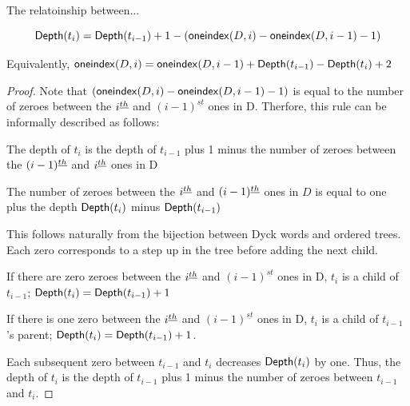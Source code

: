 \begin{remark} \label{re:depthformula}
    The relatoinship between...

    \begin{equation}
    	\mathsf{Depth}{(t_i)}=\mathsf{Depth}{(t_{i-1})}+1-(\mathsf{oneindex}({D}, i)-\mathsf{oneindex}({D}, i-1)-1) 
    \end{equation}
    

    Equivalently, $\mathsf{oneindex}({D}, i) = \mathsf{oneindex}({D}, i-1) + \mathsf{Depth}{(t_{i-1})} - \mathsf{Depth}{(t_i)} + 2$
\end{remark}
\begin{proof}

    Note that $(\mathsf{oneindex}({D}, i)-\mathsf{oneindex}({D}, i-1)-1)$ is equal to the number of zeroes between the $i^{\underline{th}}$ and $(i-1)^{\underline{st}}$ ones in D.  Therfore, this rule can be informally described as follows:

    The depth of $t_i$ is the depth of $t_{i-1}$ plus 1 minus the number of zeroes between the $(i-1)^{\underline{th}}$ and $i^{\underline{th}}$ ones in D

    The number of zeroes between the $i^{\underline{th}}$ and $(i-1)^{\underline{th}}$ ones in $D$ is equal to one plus the depth  $\mathsf{Depth}{(t_i)}$ minus $\mathsf{Depth}{(t_{i-1})}$

    This follows naturally from the bijection between Dyck words and ordered trees.  Each zero corresponds to a step up in the tree before adding the next child.  

    If there are zero zeroes between the $i^{\underline{th}}$  and $(i-1)^{\underline{st}}$ ones in D, $t_i$ is a child of $t_{i-1}$; $\mathsf{Depth}{(t_i)}=\mathsf{Depth}{(t_{i-1})}+1$

    If there is one zero between the $i^{\underline{th}}$  and $(i-1)^{\underline{st}}$ ones in D, $t_i$ is a child of $t_{i-1}$'s parent; $\mathsf{Depth}{(t_i)}=\mathsf{Depth}{(t_{i-1})}+1$.  

    Each subsequent zero between $t_{i-1}$ and $t_i$ decreases $\mathsf{Depth}{(t_{i})}$ by one.  Thus, the depth of $t_i$ is the depth of $t_{i-1}$ plus 1 minus the number of zeroes between $t_{i-1}$ and $t_{i}$.
\end{proof}


